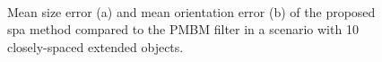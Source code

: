 \documentclass[10pt, twoside, romanappendices]{IEEEtran}
\begin{document}
 \begin{figure}[t!]
\centering
{} \\[0mm]
\caption{Mean size error (a) and mean orientation error (b) of the proposed \ac{spa} method compared to the PMBM filter in a scenario with 10 closely-spaced extended objects.}
\label{fig:errorsOrientationExtent}
\end{figure}
\end{document}
